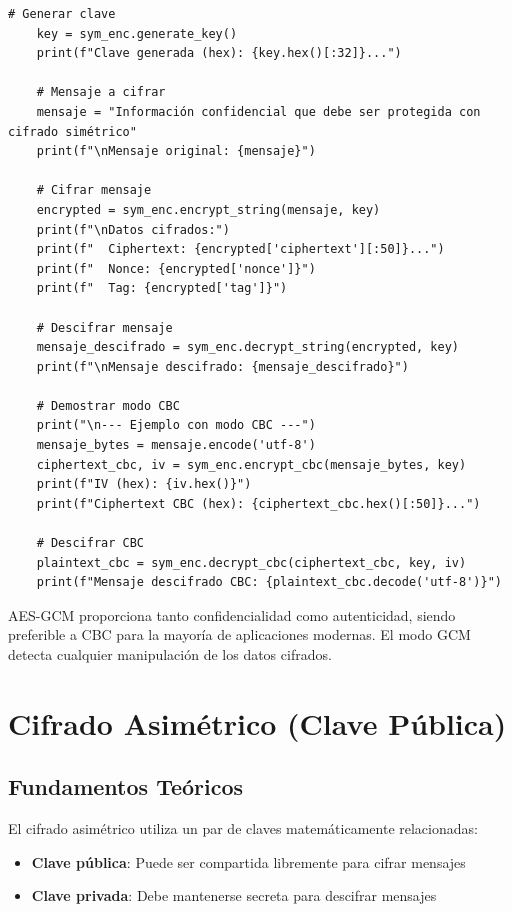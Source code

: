 \documentclass[12pt,a4paper]{article}
\begin{document}
\begin{lstlisting}[caption=Implementación de cifrado simétrico con AES]
    # Generar clave
    key = sym_enc.generate_key()
    print(f"Clave generada (hex): {key.hex()[:32]}...")
    
    # Mensaje a cifrar
    mensaje = "Información confidencial que debe ser protegida con cifrado simétrico"
    print(f"\nMensaje original: {mensaje}")
    
    # Cifrar mensaje
    encrypted = sym_enc.encrypt_string(mensaje, key)
    print(f"\nDatos cifrados:")
    print(f"  Ciphertext: {encrypted['ciphertext'][:50]}...")
    print(f"  Nonce: {encrypted['nonce']}")
    print(f"  Tag: {encrypted['tag']}")
    
    # Descifrar mensaje
    mensaje_descifrado = sym_enc.decrypt_string(encrypted, key)
    print(f"\nMensaje descifrado: {mensaje_descifrado}")
    
    # Demostrar modo CBC
    print("\n--- Ejemplo con modo CBC ---")
    mensaje_bytes = mensaje.encode('utf-8')
    ciphertext_cbc, iv = sym_enc.encrypt_cbc(mensaje_bytes, key)
    print(f"IV (hex): {iv.hex()}")
    print(f"Ciphertext CBC (hex): {ciphertext_cbc.hex()[:50]}...")
    
    # Descifrar CBC
    plaintext_cbc = sym_enc.decrypt_cbc(ciphertext_cbc, key, iv)
    print(f"Mensaje descifrado CBC: {plaintext_cbc.decode('utf-8')}")
\end{lstlisting}

\begin{cryptoanalysis}
    AES-GCM proporciona tanto confidencialidad como autenticidad, siendo preferible a CBC para la mayoría de aplicaciones modernas. El modo GCM detecta cualquier manipulación de los datos cifrados.
\end{cryptoanalysis}

\newpage

\section{Cifrado Asimétrico (Clave Pública)}

\subsection{Fundamentos Teóricos}

El cifrado asimétrico utiliza un par de claves matemáticamente relacionadas:

\begin{itemize}
    \item \textbf{Clave pública}: Puede ser compartida libremente para cifrar mensajes
    \item \textbf{Clave privada}: Debe mantenerse secreta para descifrar mensajes
\end{itemize}
\end{document}
